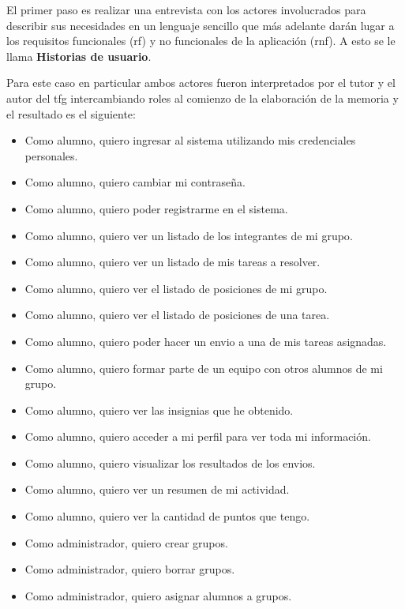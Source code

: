 \documentclass[11pt,spanish,listoffigures,listoftables]{tfgetsinf}
\begin{document}
El primer paso es realizar una entrevista con los actores involucrados para describir sus necesidades en un lenguaje sencillo que más adelante darán lugar a los requisitos funcionales (\acrshort{rf})  y no funcionales de la aplicación (\acrshort{rnf}). A esto se le llama \textbf{Historias de usuario}. \par

Para este caso en particular ambos actores fueron interpretados por el tutor y el autor del \acrshort{tfg} intercambiando roles al comienzo de la elaboración de la memoria y el resultado es el siguiente:

\begin{itemize}
	\item Como \gls{alumno}, quiero ingresar al sistema utilizando mis credenciales personales.
	\item Como \gls{alumno}, quiero cambiar mi contraseña.
	\item Como \gls{alumno}, quiero poder registrarme en el sistema.
	\item Como \gls{alumno}, quiero ver un listado de los integrantes de mi \gls{grupo}.
	\item Como \gls{alumno}, quiero ver un listado de mis \gls{tarea}s a resolver.
	\item Como \gls{alumno}, quiero ver el listado de posiciones de mi \gls{grupo}.
	\item Como \gls{alumno}, quiero ver el listado de posiciones de una \gls{tarea}. 
	\item Como \gls{alumno}, quiero poder hacer un \gls{envio} a una de mis \gls{tarea}s asignadas.
	\item Como \gls{alumno}, quiero formar parte de un equipo con otros \gls{alumno}s de mi \gls{grupo}.
	\item Como \gls{alumno}, quiero ver las \gls{insignia}s que he obtenido.
	\item Como \gls{alumno}, quiero acceder a mi perfil para ver toda mi información.
	\item Como \gls{alumno}, quiero visualizar los resultados de los \gls{envio}s.
	\item Como \gls{alumno}, quiero ver un resumen de mi actividad.
	\item Como \gls{alumno}, quiero ver la cantidad de puntos que tengo.
	\item Como \gls{administrador}, quiero crear \gls{grupo}s.
	\item Como \gls{administrador}, quiero borrar \gls{grupo}s.
	\item Como \gls{administrador}, quiero asignar \gls{alumno}s a \gls{grupo}s.

\end{itemize}
\end{document}

